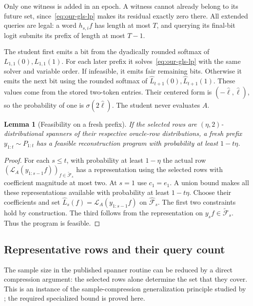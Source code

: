 \documentclass[11pt]{article}
\newtheorem{lemma}[theorem]{Lemma}
\theoremstyle{definition}
\theoremstyle{remark}
\begin{document}
Only one witness is added in an epoch. A witness cannot already belong to its future set, since~\eqref{eq:our-gls-lp} makes its residual exactly zero there. All extended queries are legal: a word $h_{s,i}f$ has length at most $T$, and querying its final-bit logit submits its prefix of length at most $T-1$.

The student first emits a bit from the dyadically rounded softmax of $L_{1,1}(0),L_{1,1}(1)$. For each later prefix it solves~\eqref{eq:our-gls-lp} with the same solver and variable order. If infeasible, it emits fair remaining bits. Otherwise it emits the next bit using the rounded softmax of $\hat L_{t+1}(0),\hat L_{t+1}(1)$. These values come from the stored two-token entries. Their centered form is $(-\hat\ell,\hat\ell)$, so the probability of one is $\sigma(2\hat\ell)$. The student never evaluates $A$.

\begin{lemma}[Feasibility on a fresh prefix]\label{lem:gls-feasibility}
If the selected rows are $(\eta,2)$-distributional spanners of their respective oracle-row distributions, a fresh prefix $y_{1:t}\sim P_{1:t}$ has a feasible reconstruction program with probability at least $1-t\eta$.
\end{lemma}
\begin{proof}
For each $s\le t$, with probability at least $1-\eta$ the actual row
$(\mathcal L_A(y_{1:s-1}f))_{f\in\tilde{\mathcal F}_s}$
has a representation using the selected rows with coefficient magnitude at most two. At $s=1$ use $c_1=e_1$. A union bound makes all these representations available with probability at least $1-t\eta$. Choose their coefficients and set
$\hat L_s(f)=\mathcal L_A(y_{1:s-1}f)$ on $\hat{\mathcal F}_s$.
The first two constraints hold by construction. The third follows from the representation on $y_sf\in\tilde{\mathcal F}_s$. Thus the program is feasible.
\end{proof}

\subsection{Representative rows and their query count}

The sample size in the published spanner routine can be reduced by a direct compression argument: the selected rows alone determine the set that they cover. This is an instance of the sample-compression generalization principle studied by \citet{floyd-warmuth}; the required specialized bound is proved here.
\end{document}
